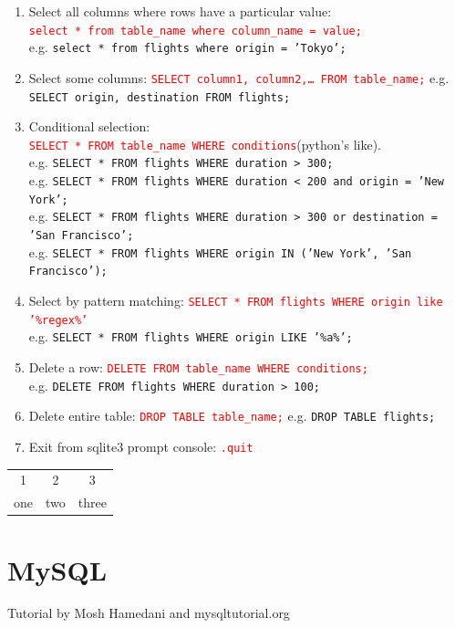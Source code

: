\documentclass[12 pt, letterpaper]{extarticle}
\newcommand{\R}{\textcolor{red}} %
\newcommand{\T}{\texttt}
\begin{document}
\begin{enumerate}
	\item Select all columns where rows have a particular value:\\
	      \R{\T{select * from table\_name where column\_name = value;}}\\
	      e.g. \textcolor{red!70}{\T{select * from flights where origin = 'Tokyo';}}
	\item Select some columns: \R{\T{SELECT column1, column2,\dots\hspace{0.1cm} FROM table\_name;}}
	      e.g. \textcolor{red!70}{\T{SELECT origin, destination FROM flights;}}
	\item Conditional selection:\\
	      \R{\T{SELECT * FROM table\_name WHERE conditions}}(python's like).\\
	      e.g. \textcolor{red!70}{\T{SELECT * FROM flights WHERE duration > 300;}}\\
	      e.g. \textcolor{red!70}{\T{SELECT * FROM flights WHERE duration < 200 and origin = 'New York';}}\\
	      e.g. \textcolor{red!70}{\T{SELECT * FROM flights WHERE duration > 300 or destination = 'San Francisco';}}\\
	      e.g. \textcolor{red!70}{\T{SELECT * FROM flights WHERE origin IN ('New York', 'San Francisco');}}
	\item Select by pattern matching: \R{\T{SELECT * FROM flights WHERE origin like '\%regex\%'}}\\
	      e.g. \textcolor{red!70}{\T{SELECT * FROM flights WHERE origin LIKE '\%a\%';}}
	\item Delete a row: \R{\T{DELETE FROM table\_name WHERE conditions;}}\\
	      e.g. \textcolor{red!70}{\T{DELETE FROM flights WHERE duration > 100;}}
	\item Delete entire table: \R{\T{DROP TABLE table\_name;}}
	      e.g. \textcolor{red!70}{\T{DROP TABLE flights;}}
	\item Exit from sqlite3 prompt console: \R{\T{.quit}}
\end{enumerate}

\begin{tabular}{c c c}
	1   & 2   & 3     \\
	one & two & three
\end{tabular}

\pagebreak

\section*{MySQL}
Tutorial by Mosh Hamedani and mysqltutorial.org\\
\end{document}
